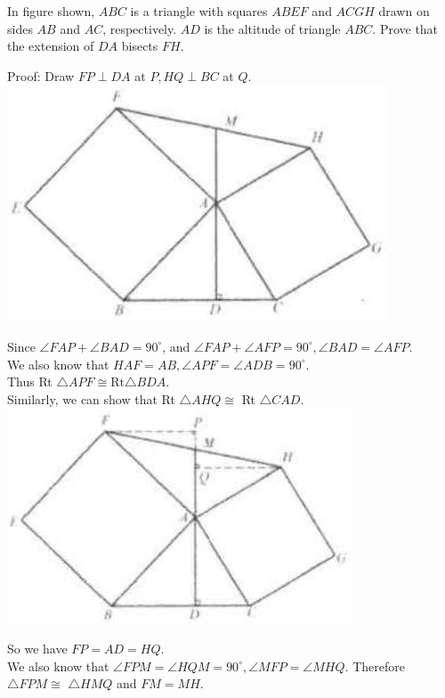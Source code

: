 \documentclass{article}
\begin{document}
In figure shown, \(A B C\) is a triangle with squares \(A B E F\) and \(A C G H\) drawn on sides \(A B\) and \(A C\), respectively. \(A D\) is the altitude of triangle \(A B C\). Prove that the extension of \(D A\) bisects \(F H\).

Proof:
Draw \(F P \perp D A\) at \(P, H Q \perp B C\) at \(Q\).\\
\centering
\includegraphics[width=\textwidth]{images/084.jpg}

Since \(\angle F A P+\angle B A D=90^{\circ}\), and \(\angle F A P+\angle A F P=90^{\circ}, \angle B A D=\angle A F P\).\\
We also know that \(H A F=A B, \angle A P F=\angle A D B=90^{\circ}\).\\
Thus Rt \(\triangle A P F \cong \mathrm{Rt} \triangle B D A\).\\
Similarly, we can show that Rt \(\triangle A H Q \cong\) Rt \(\triangle C A D\).\\
\centering
\includegraphics[width=\textwidth]{images/084(2).jpg}

So we have \(F P=A D=H Q\).\\
We also know that \(\angle F P M=\angle H Q M=90^{\circ}, \angle M F P=\angle M H Q\). Therefore \(\triangle F P M \cong\) \(\triangle H M Q\) and \(F M=M H\).
\end{document}
